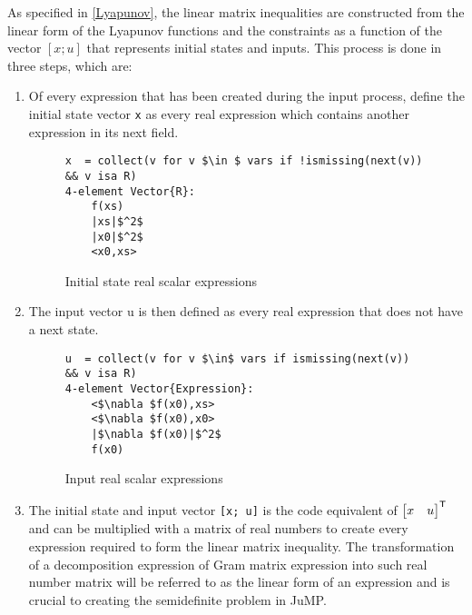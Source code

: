 As specified in \cref{Lyapunov}, the linear matrix inequalities are constructed from the linear form of the Lyapunov functions and the constraints as a function of the vector $[x; u]$ that represents initial states and inputs. This process is done in three steps, which are:
\begin{enumerate}
    \item Of every expression that has been created during the input process, define the initial state vector \texttt{x} as every real expression which contains another expression in its next field.
\begin{figure}[h!]
    \begin{lstlisting}[mathescape]
x  = collect(v for v $\in $ vars if !ismissing(next(v)) && v isa R)
4-element Vector{R}:
    f(xs)   
    |xs|$^2$ 
    |x0|$^2$
    <x0,xs>
\end{lstlisting}
\caption{Initial state real scalar expressions}
\label{ex_initstate}
\end{figure}

    \item The input vector u is then defined as every real expression that does not have a next state.
    \begin{figure}[h!]
        \begin{lstlisting}[mathescape]    
u  = collect(v for v $\in$ vars if ismissing(next(v)) && v isa R)
4-element Vector{Expression}:
    <$\nabla $f(x0),xs>
    <$\nabla $f(x0),x0>
    |$\nabla $f(x0)|$^2$
    f(x0)
        \end{lstlisting}    
    \caption{Input real scalar expressions}
    \label{ex_updatedstate_input}
    \end{figure}
    \item The initial state and input vector \texttt{[x; u]} is the code equivalent of $\begin{bmatrix}x & u\end{bmatrix}^{\mathsf{T}}$ and can be multiplied with a matrix of real numbers to create every expression required to form the linear matrix inequality. The transformation of a decomposition expression of Gram matrix expression into such real number matrix will be referred to as the linear form of an expression and is crucial to creating the semidefinite problem in JuMP.
\end{enumerate}

